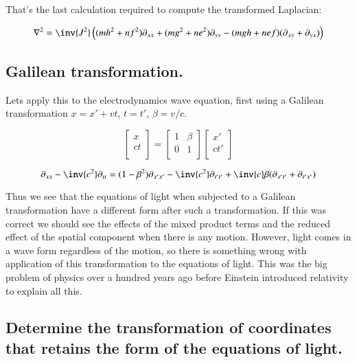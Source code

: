 That's the last calculation required to compute the transformed Laplacian:

\begin{equation}\label{eqn:Lor:laplaciantx}
\laplacian = \inv{J^2} 
\left(
(m h^2 + n f^2)\partial_{xx} 
+(m g^2 + n e^2)\partial_{yy} 
-(m g h + n e f)( \partial_{xy} + \partial_{yx}  )
\right)
\end{equation}

\subsection{Galilean transformation.}

Lets apply this to the electrodynamics wave equation, first using a Galilean transformation $x = x' + v t$, $t = t'$, $\beta = v/c$.

\begin{equation}
\begin{bmatrix}
x \\
ct \\
\end{bmatrix}
=
\begin{bmatrix}
1 & \beta \\
0 & 1 \\
\end{bmatrix}
\begin{bmatrix}
x' \\
c t' \\
\end{bmatrix}
\end{equation}

\begin{equation}
\partial_{xx} -\inv{c^2}\partial_{tt} =
(1 - \beta^2)\partial_{x'x'} 
-\inv{c^2}\partial_{t't'} 
+\inv{c}\beta( \partial_{x't'} + \partial_{t'x'} )
\end{equation}

Thus we see that the equations of light when subjected to a Galilean transformation have a different form after such a
transformation.  If this was correct we should see the effects of the mixed product terms and the reduced effect of the
spatial component when there is any motion.  However, light comes in a wave form regardless of the motion, so there
is something wrong with application of this transformation to the equations of light.  This was the big problem of physics
over a hundred years ago before Einstein introduced relativity to explain all this.

\subsection{Determine the transformation of coordinates that retains the form of the equations of light. }

